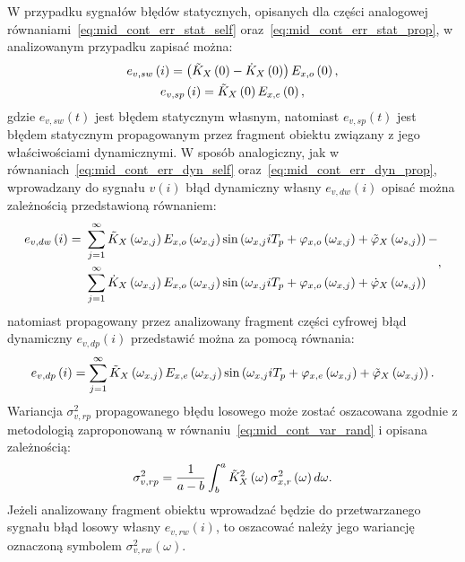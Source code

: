 W przypadku sygnałów błędów statycznych, opisanych dla części analogowej równaniami~\eqref{eq:mid_cont_err_stat_self} oraz~\eqref{eq:mid_cont_err_stat_prop}, w analizowanym przypadku zapisać można:
\begin{gather}
e_{v,sw} \left(i\right) = \left( \tilde{K}_{X} \left(0\right) - \dot{K}_{X} \left(0\right) \right) E_{x,o} \left(0\right) \label{eq:mid_disc_err_stat_self}, \\
e_{v,sp} \left(i\right) = \tilde{K}_{X} \left(0\right) E_{x,e} \left(0\right) \label{eq:mid_disc_err_stat_prop},
\end{gather}
gdzie $e_{v,sw}(t)$ jest błędem statycznym własnym, natomiast $e_{v,sp}(t)$ jest błędem statycznym propagowanym przez fragment obiektu związany z jego właściwościami dynamicznymi. W sposób analogiczny, jak w równaniach~\eqref{eq:mid_cont_err_dyn_self} oraz~\eqref{eq:mid_cont_err_dyn_prop}, wprowadzany do sygnału $v(i)$ błąd dynamiczny własny $e_{v,dw}(i)$ opisać można zależnością przedstawioną równaniem:
\begin{equation}
\begin{split}
e_{v,dw} \left(i\right) =~
& \sum _{j = 1} ^{\infty} \tilde{K}_{X} \left(\omega_{x,j}\right) E_{x,o} \left(\omega_{x,j}\right) \sin \left( \omega_{x,j} iT_{p} + \varphi_{x,o} \left(\omega_{x,j}\right) + \tilde{\varphi}_{X} \left(\omega_{s,j}\right) \right) - \\
& \sum _{j = 1} ^{\infty} \dot{K}_{X} \left(\omega_{x,j}\right) E_{x,o} \left(\omega_{x,j}\right) \sin \left( \omega_{x,j} iT_{p} + \varphi_{x,o} \left(\omega_{x,j}\right) + \dot{\varphi}_{X} \left(\omega_{s,j}\right) \right)
\end{split}
\label{eq:mid_disc_err_dyn_self},
\end{equation}
natomiast propagowany przez analizowany fragment części cyfrowej błąd dynamiczny $e_{v,dp}(i)$ przedstawić można za pomocą równania:
\begin{equation}
e_{v,dp} \left(i\right) = \sum _{j = 1} ^{\infty} \tilde{K}_{X} \left(\omega_{x,j}\right) E_{x,e} \left(\omega_{x,j}\right) \sin \left( \omega_{x,j} iT_{p} + \varphi_{x,e} \left(\omega_{x,j}\right) + \tilde{\varphi}_{X} \left(\omega_{x,j}\right) \right) \label{eq:mid_disc_err_dyn_prop}.
\end{equation}
Wariancja $\sigma_{v,rp}^{2}$ propagowanego błędu losowego może zostać oszacowana zgodnie z metodologią zaproponowaną w równaniu~\eqref{eq:mid_cont_var_rand} i opisana zależnością:
\begin{equation}
\sigma_{v,rp}^{2} = \frac{1}{a - b} \int _{b} ^{a} \tilde{K}_{X}^{2} \left(\omega\right) \sigma_{x,r}^{2} \left(\omega\right) d\omega \label{eq:mid_disc_var_rand}.
\end{equation}
Jeżeli analizowany fragment obiektu wprowadzać będzie do przetwarzanego sygnału błąd losowy własny $e_{v,rw}(i)$, to oszacować należy jego wariancję oznaczoną symbolem $\sigma_{v,rw}^{2}(\omega)$.

